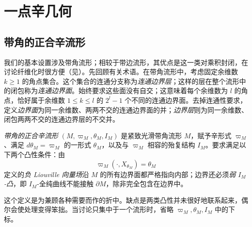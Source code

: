 \section{一点辛几何}\label{sec:7}
\subsection{带角的正合辛流形}\label{sec:7a}
我们的基本设置涉及带角流形；相较于带边流形，其优点是这一类对乘积封闭，在讨论纤维化时很方便（见）。先回顾有关术语。在带角流形中，考虑固定余维数 $k\geq1$ 的角点集合。这个集合的连通分支称为\emph{连通边界层}；这样的层在整个流形中的闭包称为\emph{连通边界面}。始终要求这些面没有自交；这意味着每个余维数为 $l$ 的角点，恰好属于余维数 $1\leq k\leq l$ 的 $2^l-1$ 个不同的连通边界面。去掉连通性要求，定义\emph{边界面}为同一余维数、两两不交的连通边界面的并；\emph{边界层}则为同一余维数、闭包两两不交的连通边界层的不交并。

\begin{definition*}
\emph{带角的正合辛流形} $(M,\varpi_M,\theta_M,I_M)$ 是紧致光滑带角流形 $M$，赋予辛形式 $\varpi_M$、满足 $d\theta_M=\varpi_M$ 的一形式 $\theta_M$，以及与 $\varpi_M$ 相容的殆复结构 $I_M$。要求满足以下两个凸性条件：由
\[
\varpi_M(\cdot,X_{\theta_M})=\theta_M
\]
定义的\emph{负 Liouville 向量场}沿 $M$ 的所有边界面都严格指向内部；边界还必须\emph{弱 $I_M$-凸}，即 $I_M$-全纯曲线不能接触 $\partial M$，除非完全包含在边界中。
\end{definition*}
这个定义是为兼顾各种需要而作的折中。缺点是两类凸性并未很好地联系起来，偶尔会使处理变得笨拙。当讨论只集中于一个流形时，省略 $\varpi_M,\theta_M,I_M$ 中的下标。

